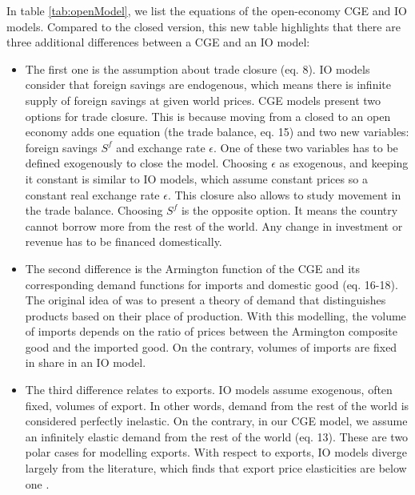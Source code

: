 In table  \ref{tab:openModel}, we list the equations of the open-economy CGE and IO models.
Compared to the closed version, this new table highlights that there are three additional differences between a CGE and an IO model: 
\begin{itemize}
	\item The first one is the assumption about trade closure (eq. 8). IO models consider that foreign savings are endogenous, which means there is infinite supply of foreign savings at given world prices. CGE models present two options for trade closure. This is because moving from a closed to an open economy adds one equation (the trade balance, eq. 15) and two new variables: foreign savings $S^f$ and exchange rate $\epsilon$. One of these two variables has to be defined exogenously to close the model. Choosing $\epsilon$ as exogenous, and keeping it constant is similar to IO models, which assume constant prices so a constant real exchange rate $\epsilon$. This closure also allows to study movement in the trade balance. Choosing $S^f$ is the opposite option. It means the country cannot borrow more from the rest of the world. Any change in investment or revenue has to be financed domestically.
	
	\item The second difference is the Armington function of the CGE and its corresponding demand functions for imports and domestic good (eq. 16-18). 
	The original idea of \citet{Armington1969} was to present a theory of demand that distinguishes products based on their place of production. 
With this modelling, the volume of imports depends on the ratio of prices between the Armington composite good and the imported good. On the contrary, volumes of imports are fixed in share in an IO model. 
	
	\item The third difference relates to exports. IO models assume exogenous, often fixed, volumes of export. In other words, demand from the rest of the world is considered perfectly inelastic. On the contrary, in our CGE model, we assume an infinitely elastic demand from the rest of the world (eq. 13). These are two polar cases for modelling exports. With respect to exports, IO models diverge largely from the literature, which finds that export price elasticities are below one \citep{Ducoudre2014}.
\end{itemize}

